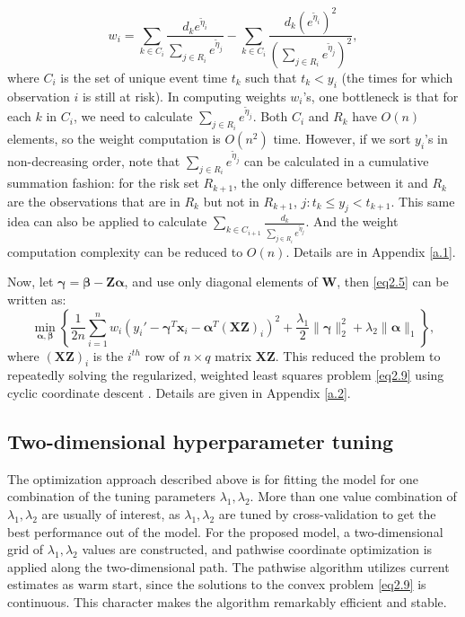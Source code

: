 \begin{equation}
    w_i=\sum_{k\in C_i}\frac{d_k e^{\tilde{\eta}_i}}{\sum_{j\in R_i}e^{\tilde{\eta}_j}}-\sum_{k\in C_i}\frac{d_k (e^{\tilde{\eta}_i})^2}{(\sum_{j\in R_i}e^{\tilde{\eta}_j})^2}, \label{eq2.8}
\end{equation}
where $C_i$ is the set of unique event time $t_k$ such that $t_k<y_i$ (the times for which observation $i$ is still at risk). In computing weights $w_i$’s, one bottleneck is that for each $k$ in $C_i$, we need to calculate $\sum_{j\in R_i}e^{\tilde{\eta}_j}$. Both $C_i$ and $R_k$ have $O(n)$ elements, so the weight computation is $O(n^2 )$ time. However, if we sort $y_i$’s in non-decreasing order, note that $\sum_{j\in R_i}e^{\tilde{\eta}_j}$ can be calculated in a cumulative summation fashion: for the risk set $R_{k+1}$, the only difference between it and $R_k$ are the observations that are in $R_k$ but not in $R_{k+1}$, ${j: t_k\leq y_j<t_{k+1}}$. This same idea can also be applied to calculate $\sum_{k\in C_{i+1}}\frac{d_k}{\sum_{j\in R_i}e^{\tilde{\eta}_j}}$. And the weight computation complexity can be reduced to $O(n)$. Details are in Appendix \ref{a.1}.

Now, let $\bm{\gamma}=\bm{\beta}-\bm{Z\alpha}$, and use only diagonal elements of $\bm{W}$, then \eqref{eq2.5} can be written as:
\begin{equation}
    \min_{\bm{\alpha},\bm{\beta}} \left\{ \frac{1}{2n} \sum_{i=1}^n w_i(y_i'-\bm{\gamma}^T\bm{x}_i-\bm{\alpha}^T(\bm{XZ})_i)^2+\frac{\lambda_1}{2}\|\bm{\gamma}\|_2^2+\lambda_2\|\bm{\alpha}\|_1 \right\}, \label{eq2.9}
\end{equation}
where $(\bm{XZ})_i$ is the $i^{th}$ row of $n\times q$ matrix $\bm{XZ}$. This reduced the problem to repeatedly solving the regularized, weighted least squares problem \eqref{eq2.9} using cyclic coordinate descent \citep{friedman2010regularization}. Details are given in Appendix \ref{a.2}.

\subsection{Two-dimensional hyperparameter tuning}
The optimization approach described above is for fitting the model for one combination of the tuning parameters $\lambda_1,\lambda_2$. More than one value combination of $\lambda_1,\lambda_2$ are usually of interest, as $\lambda_1,\lambda_2$ are tuned by cross-validation to get the best performance out of the model. For the proposed model, a two-dimensional grid of $\lambda_1,\lambda_2$ values are constructed, and pathwise coordinate optimization \citep{friedman2007pathwise} is applied along the two-dimensional path. The pathwise algorithm utilizes current estimates as warm start, since the solutions to the convex problem \eqref{eq2.9} is continuous. This character makes the algorithm remarkably efficient and stable.

